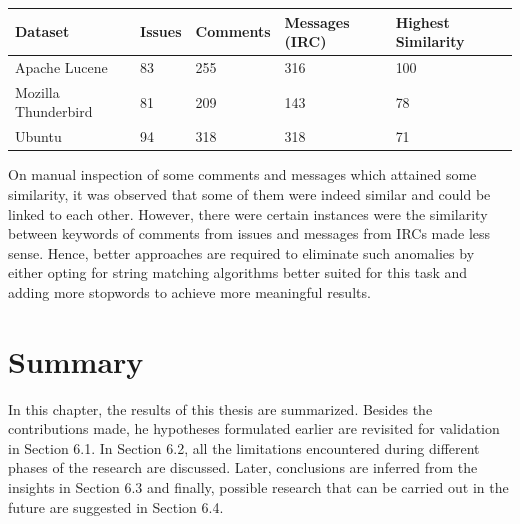 \documentclass[a4paper,12pt,twoside]{report}
\begin{document}
\begin{table} %
    \centering
    \begin{adjustbox}{max width=\columnwidth}
    \def\arraystretch{1} %
    \begin{tabular}{p{4cm} p{3cm} p{3cm} p{4cm} p{4cm}}
        \toprule
        \textbf{Dataset} & \textbf{Issues} & \textbf{Comments} & \textbf{Messages (IRC)} & \textbf{Highest Similarity}\\
        \midrule
			Apache Lucene & 83 & 255 & 316 & 100 \\
			Mozilla Thunderbird & 81 & 209 & 143 & 78 \\ 
			Ubuntu & 94 & 318 & 318 & 71 \\
        \midrule
    \end{tabular}
    \end{adjustbox}
    \label{tab:topicLinking}
\end{table}
\leavevmode
\newline \newline
On manual inspection of some comments and messages which attained some similarity, it was observed that some of them were indeed similar and could be linked to each other. However, there were certain instances were the similarity between keywords of comments from issues and messages from \acs{IRC}s made less sense. Hence, better approaches are required to eliminate such anomalies by either opting for string matching algorithms better suited for this task and adding more stopwords to achieve more meaningful results. 


\chapter{Summary}
In this chapter, the results of this thesis are summarized. Besides the contributions made, he hypotheses formulated earlier are revisited for validation in Section 6.1. In Section 6.2, all the limitations encountered during different phases of the research are discussed. Later, conclusions are inferred from the insights in Section 6.3 and finally, possible research that can be carried out in the future are suggested in Section 6.4.
\end{document}
